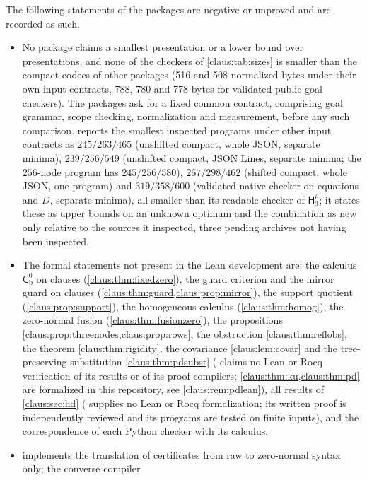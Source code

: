 The following statements of the packages are negative or unproved and are
recorded as such.
\begin{itemize}
\item No package claims a smallest presentation or a lower bound over
presentations, and none of the checkers of \cref{claus:tab:sizes} is
smaller than the compact codecs of other packages (516 and 508 normalized
bytes under their own input contracts, 788, 780 and 778 bytes for
validated public-goal checkers). The packages ask for a fixed common
contract, comprising goal grammar, scope checking, normalization and
measurement, before any such comparison. 
reports the smallest inspected programs under other input contracts as
$245/263/465$ (unshifted compact, whole JSON, separate minima),
$239/256/549$ (unshifted compact, JSON Lines, separate minima; the
$256$-node program has $245/256/580$), $267/298/462$ (shifted compact,
whole JSON, one program) and $319/358/600$ (validated native checker on
equations and $D$, separate minima), all smaller than its readable checker
of $\mathsf{H}_3^{\rho}$; it states these as upper bounds on an unknown
optimum and the combination as new only relative to the sources it
inspected, three pending archives not having been inspected.
\item The formal statements not present in the Lean development are: the
calculus $\mathsf{C}^{0}_{\mathrm{b}}$ on clauses
(\cref{claus:thm:fixedzero}), the guard criterion and the mirror guard on
clauses (\cref{claus:thm:guard,claus:prop:mirror}), the support quotient
(\cref{claus:prop:support}), the homogeneous calculus
(\cref{claus:thm:homog}), the zero-normal fusion
(\cref{claus:thm:fusionzero}), the propositions
\cref{claus:prop:threenodes,claus:prop:rows}, the obstruction
\cref{claus:thm:reflobs}, the theorem \cref{claus:thm:rigidity}, the
covariance \cref{claus:lem:covar} and the tree-preserving substitution
\cref{claus:thm:pdsubst} ( claims no Lean
or Rocq verification of its results or of its proof compilers;
\cref{claus:thm:ku,claus:thm:pd} are formalized in this repository, see
\cref{claus:rem:pdlean}), all results of \cref{claus:sec:hd}
( supplies no Lean or Rocq formalization;
its written proof is independently reviewed and its programs are tested on
finite inputs), and the
correspondence of each Python checker with its calculus.
\item {} implements the translation of
certificates from raw to zero-normal syntax only; the converse compiler

\end{itemize}
